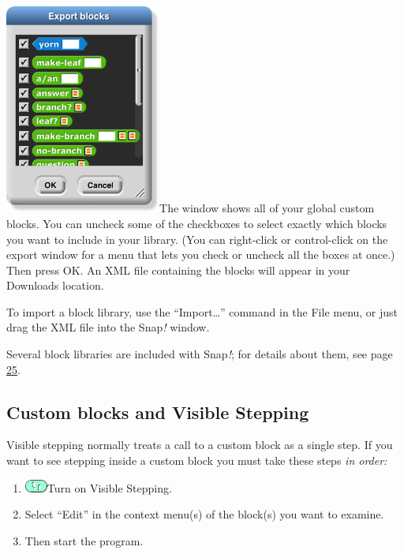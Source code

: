 \includegraphics[width=2.02153in,height=2.72222in]{media/image522.png}The
window shows all of your global custom blocks. You can uncheck some of
the checkboxes to select exactly which blocks you want to include in
your library. (You can right-click or control-click on the export window
for a menu that lets you check or uncheck all the boxes at once.) Then
press OK. An XML file containing the blocks will appear in your
Downloads location.

To import a block library, use the ``Import\ldots'' command in the File
menu, or just drag the XML file into the Snap\emph{!} window.

Several block libraries are included with Snap\emph{!}; for details
about them, see page \hyperref[libraries-1]{25}.

\subsection{Custom blocks and Visible
Stepping}\label{custom-blocks-and-visible-stepping}

Visible stepping normally treats a call to a custom block as a single
step. If you want to see stepping inside a custom block you must take
these steps \emph{in order:}

\begin{enumerate}
\def\labelenumi{\arabic{enumi}.}
\item
  \includegraphics[width=0.29167in,height=0.16667in]{media/image123.png}Turn
  on Visible Stepping.
\item
  Select ``Edit'' in the context menu(s) of the block(s) you want to
  examine.
\item
  Then start the program.
\end{enumerate}

